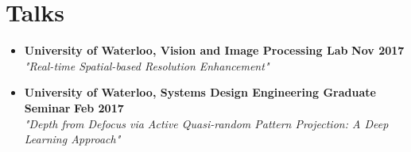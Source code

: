 \section*{Talks}
\vspace{\postsubhead}
\begin{adjustwidth}{\indentleft}{\indentright}
  \begin{itemize}
    
    
    
    
    \item \textbf{University of Waterloo, Vision and Image Processing Lab}
    \hfill
    \textbf{Nov 2017}\\
    \textit{"Real-time Spatial-based Resolution Enhancement"}
    \vspace{\interlist}
    
    
    
    \item \textbf{University of Waterloo, Systems Design Engineering Graduate Seminar}
    \hfill
    \textbf{Feb 2017}\\
    \textit{"Depth from Defocus via Active Quasi-random Pattern Projection: A Deep Learning Approach"}
    \vspace{\interlist}
    
    \vspace{\interlist}
    
  \end{itemize}
\end{adjustwidth}
